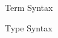 \documentclass{article}
\begin{document}
\begin{figure}[]
  \centering
  
  \caption{\EEFF Term Syntax}
\end{figure}

\begin{figure}[]
  \centering
  
  \caption{\EEFF Type Syntax}
\end{figure}
\end{document}
